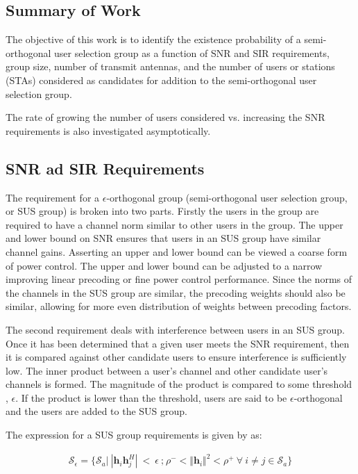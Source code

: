 \subsection{Summary of Work}
The objective of this work is to identify the existence probability of a semi-orthogonal user selection group as a function of SNR and SIR requirements, group size, number of transmit antennas, and the number of users or stations (STAs) considered as candidates for addition to the semi-orthogonal user selection group. 

The rate of growing the number of users considered vs. increasing the SNR requirements is also investigated asymptotically.

\subsection{SNR ad SIR Requirements}
The requirement for a $\epsilon$-orthogonal group (semi-orthogonal user selection group, or SUS group) is broken into two parts. Firstly the users in the group are required to have a channel norm similar to other users in the group. The upper and lower bound on SNR ensures that users in an SUS group have similar channel gains. Asserting an upper and lower bound can be viewed a coarse form of power control. The upper and lower bound can be adjusted to a narrow improving linear precoding or fine power control performance. Since the norms of the channels in the SUS group are similar, the precoding weights should also be similar, allowing for more even distribution of weights between precoding factors.

The second requirement deals with interference between users in an SUS group. Once it has been determined that a given user meets the SNR requirement, then it is compared against other candidate users to ensure interference is sufficiently low. The inner product between a user's channel and other candidate user's channels is formed. The magnitude of the product is compared to some threshold , $\epsilon$. If the product is lower than the threshold, users are said to be $\epsilon$-orthogonal and the users are added to the SUS group.

The expression for a SUS group requirements is given by as:

\begin{equation}\label{eq:S_e}
    \begin{aligned}
        \mathcal{S}_\epsilon = \lbrace \mathcal{S}_a \big|\ | \textbf{h}_i\textbf{h}_j^H |\ <\ \epsilon \ \text{;} \ \rho^-<\Vert \textbf{h}_i \Vert^2 < \rho^+\ \forall \ i \neq j \in \mathcal{S}_a \rbrace
    \end{aligned}
\end{equation}

